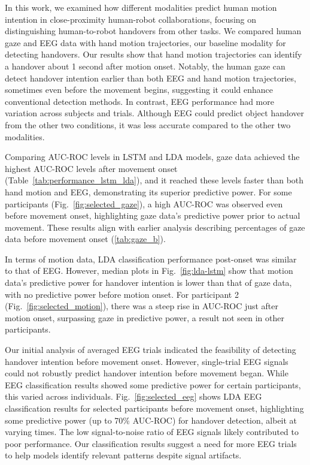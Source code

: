 
In this work, we examined how different modalities predict human motion intention in close-proximity human-robot collaborations, focusing on distinguishing human-to-robot handovers from other tasks. We compared human gaze and EEG data with hand motion trajectories, our baseline modality for detecting handovers. Our results show that hand motion trajectories can identify a handover about 1 second after motion onset. Notably, the human gaze can detect handover intention earlier than both EEG and hand motion trajectories, sometimes even before the movement begins, suggesting it could enhance conventional detection methods. In contrast, EEG performance had more variation across subjects and trials. Although EEG could predict object handover from the other two conditions, it was less accurate compared to the other two modalities. 

Comparing AUC-ROC levels in LSTM and LDA models, gaze data achieved the highest AUC-ROC levels after movement onset (Table~\ref{tab:performance_lstm_lda}), and it reached these levels faster than both hand motion and EEG, demonstrating its superior predictive power. For some participants
(Fig.~\ref{fig:selected_gaze}), a high AUC-ROC was observed even before movement onset, highlighting gaze data's predictive power prior to actual movement. These results align with earlier analysis describing percentages of gaze data before movement onset (\ref{tab:gaze_b}).

In terms of motion data, LDA classification performance post-onset was similar to that of EEG. However, median plots in Fig.~\ref{fig:lda-lstm} show that motion data's predictive power for handover intention is lower than that of gaze data, with no predictive power before motion onset. For participant 2 (Fig.~\ref{fig:selected_motion}), there was a steep rise in AUC-ROC just after motion onset, surpassing gaze in predictive power, a result not seen in other participants.

Our initial analysis of averaged EEG trials indicated the feasibility of detecting handover intention before movement onset. However, single-trial EEG signals could not robustly predict handover intention before movement began. While EEG classification results showed some predictive power for certain participants, this varied across individuals. Fig.~\ref{fig:selected_eeg} shows LDA EEG classification results for selected participants before movement onset, highlighting some predictive power (up to 70\% AUC-ROC) for handover detection, albeit at varying times. The low signal-to-noise ratio of EEG signals likely contributed to poor performance. Our classification results suggest a need for more EEG trials to help models identify relevant patterns despite signal artifacts.

